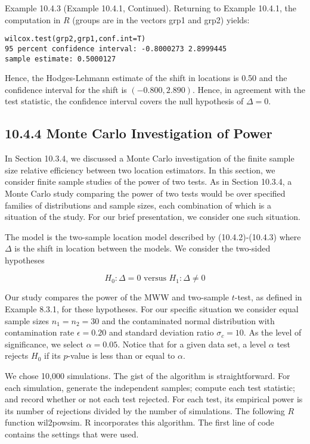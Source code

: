 Example 10.4.3 (Example 10.4.1, Continued). Returning to Example 10.4.1, the computation in $R$ (groups are in the vectors grp1 and grp2) yields:

\begin{verbatim}
wilcox.test(grp2,grp1,conf.int=T)
95 percent confidence interval: -0.8000273 2.8999445
sample estimate: 0.5000127
\end{verbatim}

Hence, the Hodges-Lehmann estimate of the shift in locations is 0.50 and the confidence interval for the shift is $(-0.800,2.890)$. Hence, in agreement with the test statistic, the confidence interval covers the null hypothesis of $\Delta=0$.

\subsection*{10.4.4 Monte Carlo Investigation of Power}
In Section 10.3.4, we discussed a Monte Carlo investigation of the finite sample size relative efficiency between two location estimators. In this section, we consider finite sample studies of the power of two tests. As in Section 10.3.4, a Monte Carlo study comparing the power of two tests would be over specified families of distributions and sample sizes, each combination of which is a situation of the study. For our brief presentation, we consider one such situation.

The model is the two-sample location model described by (10.4.2)-(10.4.3) where $\Delta$ is the shift in location between the models. We consider the two-sided hypotheses


\begin{equation*}
H_{0}: \Delta=0 \text { versus } H_{1}: \Delta \neq 0 \tag{10.4.33}
\end{equation*}


Our study compares the power of the MWW and two-sample $t$-test, as defined in Example 8.3.1, for these hypotheses. For our specific situation we consider equal sample sizes $n_{1}=n_{2}=30$ and the contaminated normal distribution with contamination rate $\epsilon=0.20$ and standard deviation ratio $\sigma_{c}=10$. As the level of significance, we select $\alpha=0.05$. Notice that for a given data set, a level $\alpha$ test rejects $H_{0}$ if its $p$-value is less than or equal to $\alpha$.

We chose 10,000 simulations. The gist of the algorithm is straightforward. For each simulation, generate the independent samples; compute each test statistic; and record whether or not each test rejected. For each test, its empirical power is its number of rejections divided by the number of simulations. The following $R$ function wil2powsim. R incorporates this algorithm. The first line of code contains the settings that were used.

